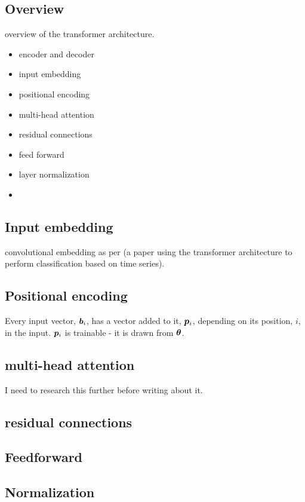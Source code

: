 \subsection{Overview}
overview of the transformer architecture.
\begin{itemize}
	\item encoder and decoder
	\item input embedding
	\item positional encoding
	\item multi-head attention
	\item residual connections
	\item feed forward
	\item layer normalization
	\item 
\end{itemize}

\subsection{Input embedding}
convolutional embedding as per \citep{Song2017} (a paper using the transformer architecture to perform classification based on time series).

\subsection{Positional encoding}
Every input vector, ${\bm{b}}_i$, has a vector added to it, ${\bm{p}}_i$, depending on its position, $i$, in the input.
${\bm{p}}_i$ is trainable - it is drawn from ${\bm{\theta}}$.

\subsection{multi-head attention}
I need to research this further before writing about it.

\subsection{residual connections}

\subsection{Feedforward}

\subsection{Normalization}


